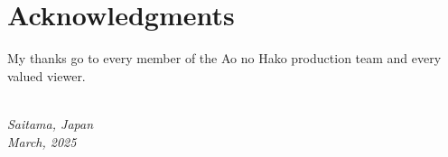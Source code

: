 \chapter*{Acknowledgments}

My thanks go to every member of the Ao no Hako production team and every valued viewer.
\begin{flushright}
  {\small\itshape
    \guauthor\\
    Saitama, Japan\\
    March, 2025}
\end{flushright}
